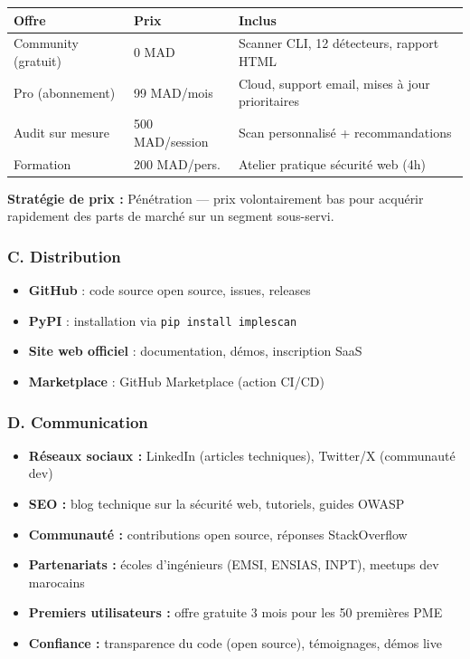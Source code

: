 \documentclass[12pt,a4paper]{report}
\newcommand{\hdr}[1]{\cellcolor{gray!15}\textbf{#1}}
\newcommand{\rowA}{\rowcolor{gray!8}}
\begin{document}
\begin{table}[H]
\centering
\begin{tabular}{p{4cm}p{3cm}p{5cm}}
\toprule
\hdr{Offre} & \hdr{Prix} & \hdr{Inclus} \\
\midrule
Community (gratuit) & 0 MAD & Scanner CLI, 12 détecteurs, rapport HTML \\
\rowA Pro (abonnement) & 99 MAD/mois & Cloud, support email, mises à jour prioritaires \\
Audit sur mesure & 500 MAD/session & Scan personnalisé + recommandations \\
\rowA Formation & 200 MAD/pers. & Atelier pratique sécurité web (4h) \\
\bottomrule
\end{tabular}
\end{table}

\textbf{Stratégie de prix :} Pénétration --- prix volontairement bas pour acquérir rapidement des parts de marché sur un segment sous-servi.

\subsubsection{C. Distribution}

\begin{itemize}
  \item \textbf{GitHub} : code source open source, issues, releases
  \item \textbf{PyPI} : installation via \texttt{pip install implescan}
  \item \textbf{Site web officiel} : documentation, démos, inscription SaaS
  \item \textbf{Marketplace} : GitHub Marketplace (action CI/CD)
\end{itemize}

\subsubsection{D. Communication}

\begin{itemize}
  \item \textbf{Réseaux sociaux :} LinkedIn (articles techniques), Twitter/X (communauté dev)
  \item \textbf{SEO :} blog technique sur la sécurité web, tutoriels, guides OWASP
  \item \textbf{Communauté :} contributions open source, réponses StackOverflow
  \item \textbf{Partenariats :} écoles d'ingénieurs (EMSI, ENSIAS, INPT), meetups dev marocains
  \item \textbf{Premiers utilisateurs :} offre gratuite 3 mois pour les 50 premières PME
  \item \textbf{Confiance :} transparence du code (open source), témoignages, démos live
\end{itemize}
\end{document}
